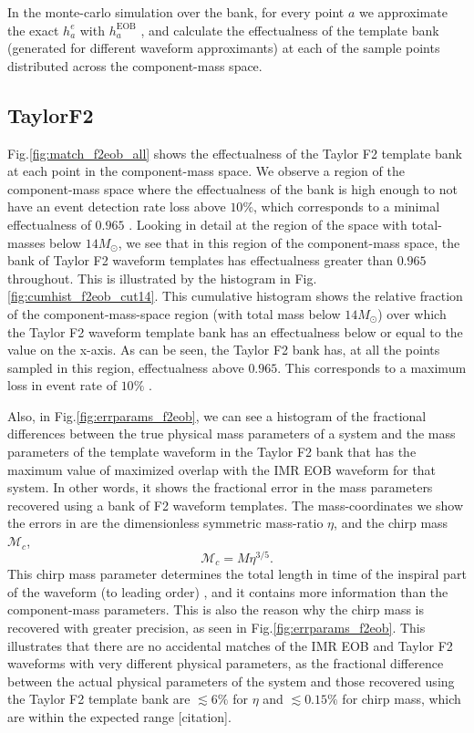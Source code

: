 \documentclass[aps,
prd,
amsmath,
amssymb,
twocolumn,
floatfix,
groupedaddress]{revtex4-1}
\newcommand{\EOB}{\mathrm{EOB}}
\begin{document}
In the monte-carlo simulation over the bank, for every point $a$ we approximate the exact $h^e_a$ with $h^{\EOB}_a$ \citep{EOBNRdevel01}, and calculate the effectualness of the template bank (generated for different waveform approximants) at each of the sample points distributed across the component-mass space.

\subsection{TaylorF2}\label{sec:level2:EffectualnessTaylorF2}
Fig.\ref{fig:match_f2eob_all} shows the effectualness of the Taylor F2 template bank at each point in the component-mass space. We observe a region of the component-mass space where the effectualness of the bank is high enough to not have an event detection rate loss above $10\%$, which corresponds to a minimal effectualness of $0.965$ \citep{WaveformAccuracy2008}. Looking in detail at the region of the space with total-masses below $14M_{\odot}$, we see that in this region of the component-mass space, the bank of Taylor F2 waveform templates has effectualness greater than $0.965$ throughout. This is illustrated by the histogram in Fig.\ref{fig:cumhist_f2eob_cut14}. This cumulative histogram shows the relative fraction of the component-mass-space region (with total mass below $14M_{\odot}$) over which the Taylor F2 waveform template bank has an effectualness below or equal to the value on the x-axis. As can be seen, the Taylor F2 bank has, at all the points sampled in this region, effectualness above $0.965$.
 This corresponds to a maximum loss in event rate of $10\%$ \citep{WaveformAccuracy2008}.

Also, in Fig.\ref{fig:errparams_f2eob}, we can see a histogram of the fractional differences between the true physical mass parameters of a system and the mass parameters of the template waveform in the Taylor F2 bank that has the maximum value of maximized overlap with the IMR EOB waveform for that system. In other words, it shows the fractional error in the mass parameters recovered using a bank of F2 waveform templates. The mass-coordinates we show the errors in are the dimensionless symmetric mass-ratio $\eta$, and the chirp mass $\mathcal{M}_c$,
\begin{equation}
\mathcal{M}_c = M \eta^{3/5}.
\end{equation}
This chirp mass parameter determines the total length in time of the inspiral part of the waveform (to leading order) \citep{SathyaBankPlacementTauN}, and it contains more information than the component-mass parameters. This is also the reason why the chirp mass is recovered with greater precision, as seen in Fig.\ref{fig:errparams_f2eob}. This illustrates that there are no accidental matches of the IMR EOB and Taylor F2 waveforms with very different physical parameters, as the fractional difference between the actual physical parameters of the system and those recovered using the Taylor F2 template bank are $\lesssim 6\%$ for $\eta$ and $\lesssim 0.15\%$ for chirp mass, which are within the expected range [citation].
\end{document}
